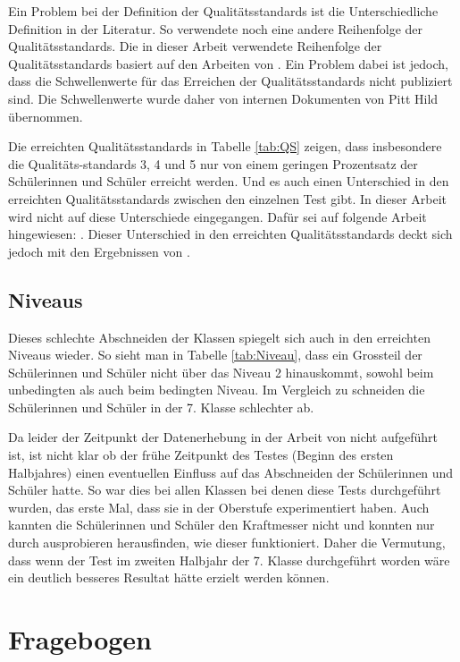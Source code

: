 Ein Problem bei der Definition der Qualitätsstandards ist die Unterschiedliche Definition in der Literatur. So verwendete \citet{Gut2013a} noch eine andere Reihenfolge der Qualitätsstandards. Die in dieser Arbeit verwendete Reihenfolge der Qualitätsstandards basiert auf den Arbeiten von \citet{Metzger2013, Hild2014a}. Ein Problem dabei ist jedoch, dass die Schwellenwerte für das Erreichen der Qualitätsstandards nicht publiziert sind. Die Schwellenwerte wurde daher von internen Dokumenten von Pitt Hild übernommen.

Die erreichten Qualitätsstandards in Tabelle \ref{tab:QS} zeigen, dass insbesondere die Qualitäts-standards 3, 4 und 5 nur von einem geringen Prozentsatz der Schülerinnen und Schüler erreicht werden. Und es auch einen Unterschied in den erreichten Qualitätsstandards zwischen den einzelnen Test gibt. In dieser Arbeit wird nicht auf diese Unterschiede eingegangen. Dafür sei auf folgende Arbeit hingewiesen: \citet{Sichau2015}. Dieser Unterschied in den erreichten Qualitätsstandards deckt sich jedoch mit den Ergebnissen von \citet{Metzger2013}.

\subsection{Niveaus}

Dieses schlechte Abschneiden der Klassen spiegelt sich auch in den erreichten Niveaus wieder. So sieht man in Tabelle \ref{tab:Niveau}, dass ein Grossteil der Schülerinnen und Schüler nicht über das Niveau 2 hinauskommt, sowohl beim unbedingten als auch beim bedingten Niveau. Im Vergleich zu \citet{Metzger2013} schneiden die Schülerinnen und Schüler in der 7. Klasse schlechter ab. 

Da leider der Zeitpunkt der Datenerhebung in der Arbeit von \citet{Metzger2013} nicht aufgeführt ist, ist nicht klar ob der frühe Zeitpunkt des Testes (Beginn des ersten Halbjahres) einen eventuellen Einfluss auf das Abschneiden der Schülerinnen und Schüler hatte. So war dies bei allen Klassen bei denen diese Tests durchgeführt wurden, das erste Mal, dass sie in der Oberstufe experimentiert haben. Auch kannten die Schülerinnen und Schüler den Kraftmesser nicht und konnten nur durch ausprobieren herausfinden, wie dieser funktioniert. Daher die Vermutung, dass wenn der Test im zweiten Halbjahr der 7. Klasse durchgeführt worden wäre ein deutlich besseres Resultat hätte erzielt werden können.



\section{Fragebogen}

